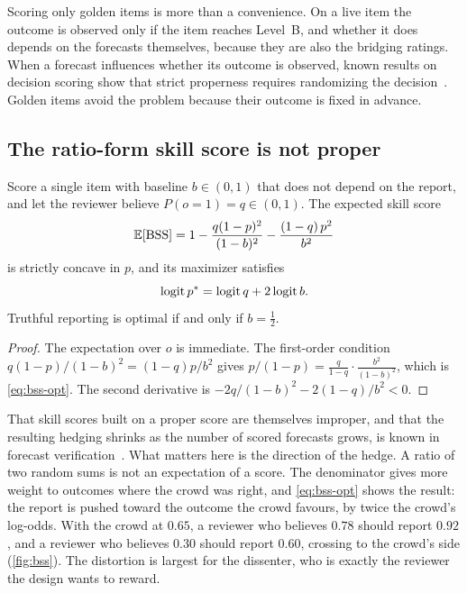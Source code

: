 Scoring only golden items is more than a convenience. On a live item the outcome is observed only
if the item reaches Level~B, and whether it does depends on the forecasts themselves, because they
are also the bridging ratings. When a forecast influences whether its outcome is observed, known
results on decision scoring show that strict properness requires randomizing the
decision~\cite{othman2010decision,chen2014eliciting}.
Golden items avoid the problem because their outcome is fixed in advance.

\subsection{The ratio-form skill score is not proper}

\begin{proposition}\label{prop:bss}\proved{}
Score a single item with baseline $b\in(0,1)$ that does not depend on the report, and let the
reviewer believe $P(o=1)=q\in(0,1)$. The expected skill score
\[
  \mathbb{E}[\mathrm{BSS}]=1-\frac{q(1-p)^2}{(1-b)^2}-\frac{(1-q)\,p^2}{b^2}
\]
is strictly concave in $p$, and its maximizer satisfies
\begin{equation}\label{eq:bss-opt}
  \operatorname{logit} p^{*}=\operatorname{logit} q+2\operatorname{logit} b .
\end{equation}
Truthful reporting is optimal if and only if $b=\tfrac12$.
\end{proposition}
\begin{proof}
The expectation over $o$ is immediate. The first-order condition
$q(1-p)/(1-b)^2=(1-q)p/b^2$ gives $p/(1-p)=\frac{q}{1-q}\cdot\frac{b^2}{(1-b)^2}$, which is
\eqref{eq:bss-opt}. The second derivative is $-2q/(1-b)^2-2(1-q)/b^2<0$.
\end{proof}

That skill scores built on a proper score are themselves improper, and that the resulting hedging
shrinks as the number of scored forecasts grows, is known in forecast
verification~\cite{murphy1973hedging}. What matters here is the direction of the hedge. A ratio of
two random sums is not an expectation of a score. The denominator gives more weight to outcomes
where the crowd was right, and \eqref{eq:bss-opt} shows the result: the report is pushed
toward the outcome the crowd favours, by twice the crowd's log-odds. With the crowd at $0.65$,
a reviewer who believes $0.78$ should report $0.92$, and a reviewer who believes $0.30$ should
report $0.60$, crossing to the crowd's side (\cref{fig:bss}). The distortion is largest for the
dissenter, who is exactly the reviewer the design wants to reward.

